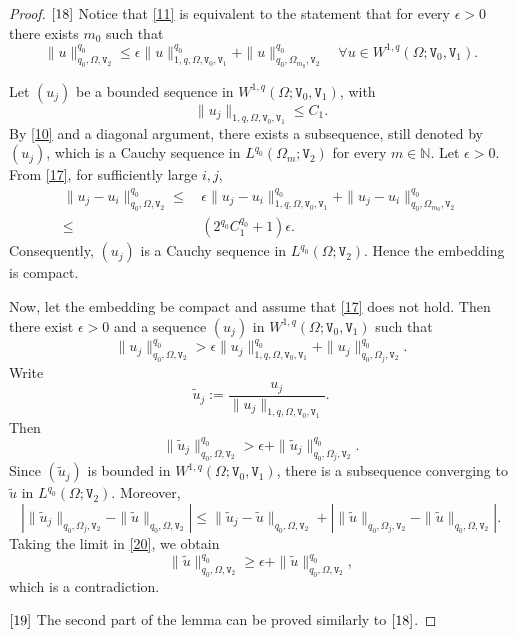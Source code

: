 \documentclass[reqno, 11pt, a4paper]{amsart}
\numberwithin{equation}{section}
\newcommand{\wghtv}{\mathtt{V}}
\newcommand{\qxp}{q}
\begin{document}
\begin{proof}
$\ref{18}$ Notice that \eqref{11} is equivalent to the statement that for every $\epsilon>0$ there exists $m_0$ such that
\begin{equation}\label{17}
\|u\|_{\qxp_0,\Omega,\wghtv_2}^{\qxp_0}
\leq\epsilon\|u\|_{1,\qxp,\Omega,\wghtv_0,\wghtv_1}^{\qxp_0}
+\|u\|_{\qxp_0,\Omega_{m_0},\wghtv_2}^{\qxp_0}
\quad\forall u\in W^{1,\qxp}(\Omega;\wghtv_0,\wghtv_1).
\end{equation}

Let $(u_j)$ be a bounded sequence in $W^{1,\qxp}(\Omega;\wghtv_0,\wghtv_1)$, with
$$
\|u_j\|_{1,\qxp,\Omega,\wghtv_0,\wghtv_1}\leq C_1.
$$
{By \eqref{10} and a diagonal argument, there exists a subsequence, still denoted by $(u_j)$, which is a Cauchy sequence in $L^{\qxp_0}(\Omega_m;\wghtv_2)$ for every $m\in\mathbb N$.}
Let $\epsilon>0$. From \eqref{17}, for sufficiently large $i,j$,
\begin{align*}
\|u_j-u_i\|_{\qxp_0,\Omega,\wghtv_2}^{\qxp_0}
\leq&\,\displaystyle\epsilon\|u_j-u_i\|_{1,\qxp,\Omega,\wghtv_0,\wghtv_1}^{\qxp_0}
+\|u_j-u_i\|_{\qxp_0,\Omega_{m_0},\wghtv_2}^{\qxp_0}\\[3pt]
\leq&\,\displaystyle\left(2^{\qxp_0}C_1^{\qxp_0}+1\right)\epsilon.
\end{align*}
Consequently, $(u_j)$ is a Cauchy sequence in $L^{\qxp_0}(\Omega;\wghtv_2)$. Hence the embedding is compact.

Now, let the embedding be compact and assume that \eqref{17} does not hold. Then there exist $\epsilon>0$ and a sequence $(u_j)$ in $W^{1,\qxp}(\Omega;\wghtv_0,\wghtv_1)$ such that
$$
\|u_j\|_{\qxp_0,\Omega,\wghtv_2}^{\qxp_0}
>\epsilon\|u_j\|_{1,\qxp,\Omega,\wghtv_0,\wghtv_1}^{\qxp_0}
+\|u_j\|_{\qxp_0,\Omega_j,\wghtv_2}^{\qxp_0}.
$$
Write
$$
\tilde u_j:=\frac{u_j}{\|u_j\|_{1,\qxp,\Omega,\wghtv_0,\wghtv_1}}.
$$
Then
\begin{equation}\label{20}
\|\tilde u_j\|_{\qxp_0,\Omega,\wghtv_2}^{\qxp_0}
>\epsilon+\|\tilde u_j\|_{\qxp_0,\Omega_j,\wghtv_2}^{\qxp_0}.
\end{equation}
Since $(\tilde u_j)$ is bounded in $W^{1,\qxp}(\Omega;\wghtv_0,\wghtv_1)$, there is a subsequence converging to $\tilde u$ in $L^{\qxp_0}(\Omega;\wghtv_2)$. Moreover,
$$
\left|\|\tilde u_j\|_{\qxp_0,\Omega_j,\wghtv_2}-\|\tilde u\|_{\qxp_0,\Omega,\wghtv_2}\right|
\leq\|\tilde u_j-\tilde u\|_{\qxp_0,\Omega,\wghtv_2}
+\left|\|\tilde u\|_{\qxp_0,\Omega_j,\wghtv_2}-\|\tilde u\|_{\qxp_0,\Omega,\wghtv_2}\right|.
$$
Taking the limit in \eqref{20}, we obtain
$$
\|\tilde u\|_{\qxp_0,\Omega,\wghtv_2}^{\qxp_0}
\geq\epsilon+\|\tilde u\|_{\qxp_0,\Omega,\wghtv_2}^{\qxp_0},
$$
which is a contradiction.

\medskip

$\ref{19}$ The second part of the lemma can be proved similarly to $\ref{18}$.
\end{proof}
\end{document}
